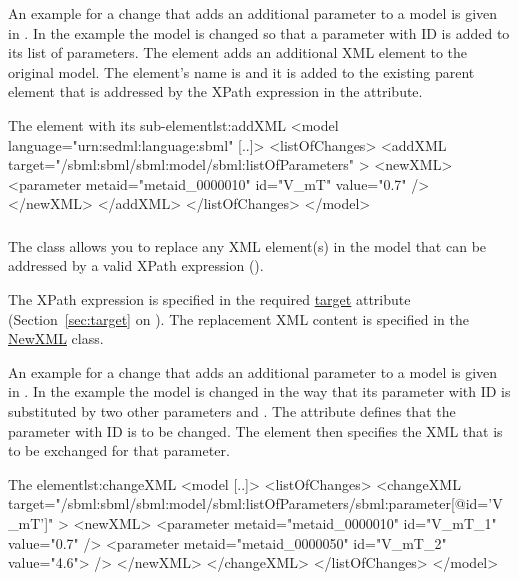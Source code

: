 An example for a change that adds an additional parameter to a model is given in . In the example the model is changed so that a parameter with ID  is added to its list of parameters. The  element adds an additional XML element to the original model. The element's name is  and it is added to the existing parent element  that is addressed by the XPath expression in the  attribute.

\begin{myXmlLst}{The  element with its  sub-element}{lst:addXML}
<model language="urn:sedml:language:sbml" [..]>
	<listOfChanges>
		<addXML target="/sbml:sbml/sbml:model/sbml:listOfParameters" >
			<newXML>
				<parameter metaid="metaid_0000010" id="V_mT" value="0.7" />
			</newXML>
		</addXML>
	</listOfChanges>
</model>
\end{myXmlLst}


\subsubsection{}
\label{class:changeXml}
The  class allows you to replace any XML element(s) in the model that can be addressed by a valid XPath expression ().

The XPath expression is specified in the required \hyperref[sec:target]{target} attribute (Section~\ref{sec:target} on ). The replacement XML content is specified in the \hyperref[sec:newXml]{NewXML} class.

An example for a change that adds an additional parameter to a model is given in . In the example the model is changed in the way that its parameter with ID  is substituted by two other parameters  and . The  attribute defines that the parameter with ID  is to be changed. The  element then specifies the XML that is to be exchanged for that parameter.

\begin{myXmlLst}{The  element}{lst:changeXML}
<model [..]>
	<listOfChanges>
		<changeXML target="/sbml:sbml/sbml:model/sbml:listOfParameters/sbml:parameter[@id='V_mT']" >
			<newXML>
				<parameter metaid="metaid_0000010" id="V_mT_1" value="0.7" />
				<parameter metaid="metaid_0000050" id="V_mT_2" value="4.6"> />
			</newXML>
		</changeXML>
	</listOfChanges>
</model>
\end{myXmlLst}


